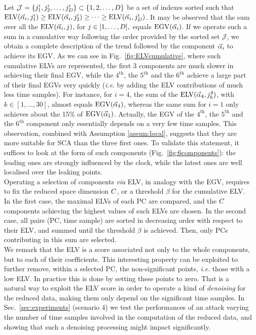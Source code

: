 Let $\mathcal{J}=\{j^i_1, j^i_2, \dots, j^i_{D}\}\subset\{1,2,\dots,D\}$ be a set of indexes sorted such that $\mathrm{ELV}(\vec{\alpha}_i,j^i_1)\geq \mathrm{ELV}(\vec{\alpha}_i,j^i_2)\geq \dots \geq \mathrm{ELV}(\vec{\alpha}_i,j^i_D)$.
It may be observed that the sum over all the $\mathrm{ELV}(\vec{\alpha}_i,j)$, for $j\in[1,\dots,D],$   equals $\mathrm{EGV}(\vec{\alpha}_i)$. If we operate such a sum in a cumulative way following the order provided by the sorted set $\mathcal{J}$, we obtain a complete description of the trend followed by the component $\vec{\alpha}_i$ to achieve its EGV. As we can see in Fig.~\ref{fig:ELVcumulative}, where such cumulative ELVs are represented, the first 3 components are much slower in achieving their final EGV, while the $4^\text{th}$, the $5^\text{th}$ and the $6^\text{th}$ achieve a large part of their final EGVs very quickly ({\em i.e.} by adding the ELV contributions of much less time samples). For instance, for $i=4$, the sum of the $\mathrm{ELV}(\vec{\alpha}_4, j^4_k)$, with $k\in[1,\dots,30]$, almost equals $\mathrm{EGV}(\vec{\alpha}_4)$, whereas the same sum for $i=1$ only achieves about the 15\% of $\mathrm{EGV}(\vec{\alpha}_1)$. Actually, the EGV of the $4^\text{th}$, the $5^\text{th}$ and the $6^\text{th}$ component only essentially depends on a very few time samples. This observation, combined with Assumption \ref{assum:local}, suggests that they are more suitable for SCA than the three first ones. To validate this statement, it suffices to look at the form of such components (Fig.~\ref{fig:6components}): the leading ones are strongly influenced by the clock, while the latest ones are well localised over the leaking points.\\

Operating a selection of components {\em via} ELV, in analogy with the EGV, requires to fix the reduced space dimension $C$, or a threshold $\beta$ for the cumulative ELV. In the first case, the maximal ELVs of each PC are compared, and the $C$ components achieving the highest values of such ELVs are chosen. In the second case, all pairs (PC, time sample) are sorted in decreasing order with respect to their ELV, and summed until the threshold $\beta$ is achieved. Then, only PCs contributing in this sum are selected. \\

We remark that the ELV is a score associated not only to the whole components, but to each of their coefficients. This interesting property can be exploited to further remove, within a selected PC, the non-significant points, {\em i.e.} those with a low ELV. In practice this is done by setting these points to zero. That is a natural way to exploit the ELV score in order to operate a kind of {\em denoising} for the reduced data, making them only depend  on the significant time samples. In Sec.~\ref{sec:experiments} (scenario 4) we test the performances of an attack varying the number of time samples involved in the computation of the reduced data, and showing that such a denoising processing might impact significantly. 



